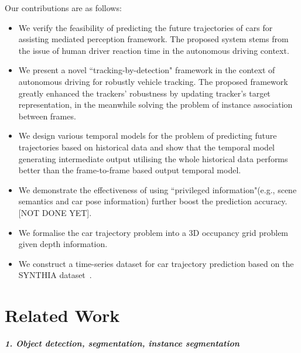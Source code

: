 \documentclass[10pt,twocolumn,letterpaper]{article}
\begin{document}
Our contributions are as follows:
\begin{itemize}

\item We verify the feasibility of predicting the future trajectories of cars for assisting mediated perception framework. The proposed system stems from the issue of human driver reaction time in the autonomous driving context.

\item We present a novel ``tracking-by-detection" framework in the context of autonomous driving for robustly vehicle tracking. The proposed framework greatly enhanced the trackers' robustness by updating tracker's target representation, in the meanwhile solving the problem of instance association between frames.

\item We design various temporal models for the problem of predicting future trajectories based on historical data and show that the temporal model generating intermediate output utilising the whole historical data performs better than the frame-to-frame based output temporal model.

\item We demonstrate the effectiveness of using ``privileged information"(e.g., scene semantics and car pose information) further boost the prediction accuracy. [NOT DONE YET].

\item We formalise the car trajectory problem into a 3D occupancy grid problem given depth information.

\item We construct a time-series dataset for car trajectory prediction based on the SYNTHIA dataset~\cite{ros2016synthia}.

\end{itemize}



\section{Related Work}

\textbf{\emph{1. Object detection, segmentation, instance segmentation}}
\end{document}
